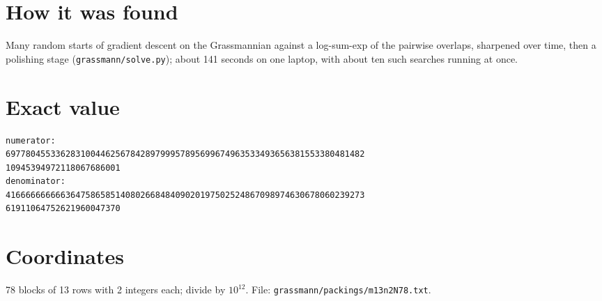 \documentclass[11pt,a4paper]{article}
\begin{document}
\section{How it was found}
Many random starts of gradient descent on the Grassmannian against a log-sum-exp of the pairwise overlaps, sharpened over time, then a polishing stage (\texttt{grassmann/solve.py}); about 141 seconds on one laptop, with about ten such searches running at once.


\appendix
\section{Exact value}
{\small
\begin{verbatim}
numerator:
697780455336283100446256784289799957895699674963533493656381553380481482
10945394972118067686001
denominator:
416666666666364758658514080266848409020197502524867098974630678060239273
61911064752621960047370
\end{verbatim}}

\section{Coordinates}
78 blocks of 13 rows with 2 integers each; divide by $10^{12}$. File: \texttt{grassmann/packings/m13n2N78.txt}.
{\tiny
\begin{multicols}{4}
\end{multicols}}
\end{document}
